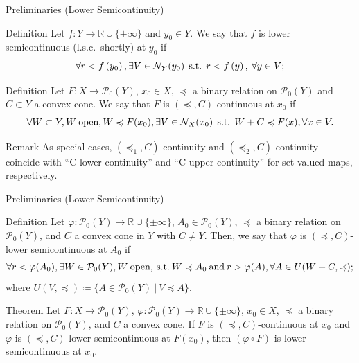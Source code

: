\documentclass[aspectratio=169, dvipdfmx, 11pt]{beamer}
\newcommand{\RealNumberSet}{\mathbb{R}}
\newcommand{\Nbd}[2]{\mbox{$\mathcal{N}_{#1}({#2})$}}
\newcommand{\pow}[1]{\mathcal{P}_{0}(#1)}
\newcommand{\SuchThat}{\:\text{s.t.}\:}
\newcommand{\SetForm}[2]{
  \{{#1}\:|\:{#2}\}
}
\begin{document}
\begin{frame}{Preliminaries (Lower Semicontinuity)}
  \begin{block}{Definition}
    Let $f:Y\rightarrow \RealNumberSet \cup \{ \pm \infty\}$ and $y_{0}\in{Y}$.
    We say that $f$ is
    lower semicontinuous (l.s.c.\ shortly) at $y_{0}$ if
    \begin{equation}
      \forall r < f \left( y_{0} \right),
      \exists V \in \Nbd{Y}{y_{0}} \:\SuchThat\: r < f \left( y \right),\: \forall y \in V; \notag
    \end{equation}
  \end{block}

  \begin{block}{Definition \cite{500001551932}}
    Let $F \colon X \to \pow{Y}$, $x_0 \in X$, $\preccurlyeq$ a binary relation on $\pow{Y}$
    and $C \subset Y$ a convex cone. We say that $F$ is $(\preccurlyeq, C)$-continuous at $x_0$ if
    \begin{equation}
      \forall W \subset Y, W\:\text{open},W \preccurlyeq F(x_0), \exists V \in \mathcal{N}_{X}(x_0) \:\SuchThat\: W + C \preccurlyeq F(x), \forall x \in V. \notag
    \end{equation}
  \end{block}

  \begin{alertblock}{Remark}
    As special cases, $(\preccurlyeq_1, C)$-continuity and $(\preccurlyeq_2, C)$-continuity coincide with “C-lower
    continuity” and “C-upper continuity” for set-valued maps, respectively.
  \end{alertblock}
\end{frame}

\begin{frame}{Preliminaries (Lower Semicontinuity)}
  \begin{block}{Definition \cite{500001551932}}
    Let $\varphi \colon \pow{Y} \to \RealNumberSet \cup \{\pm \infty\}$, $A_0 \in \pow{Y}$,
    $\preccurlyeq$ a binary relation on $\pow{Y}$, and $C$ a convex cone in $Y$ with $C \ne Y$. Then,
    we say that $\varphi$ is $(\preccurlyeq, C)$-lower semicontinuous at $A_0$ if
    \begin{equation}
      \forall r < \varphi (A_0), \exists W \in \pow{Y}, W\:\text{open}, \SuchThat W \preccurlyeq A_0 \:\text{and}\:
      r > \varphi (A), \forall A \in U(W + C, \preccurlyeq); \notag
    \end{equation}
    where $U(V,\preccurlyeq) \coloneqq \SetForm{A \in \pow{Y}}{V \preccurlyeq A}$.
  \end{block}

  \begin{block}{Theorem \cite{500001551932}}
    Let $F \colon X \to \pow{Y}$, $\varphi \colon \pow{Y} \to \RealNumberSet \cup \{\pm \infty\}$, $x_0 \in X$,
    $\preccurlyeq$ a binary relation on $\pow{Y}$, and $C$ a convex cone. If $F$ is $(\preccurlyeq, C)$-continuous at $x_0$
    and $\varphi$ is $(\preccurlyeq, C)$-lower semicontinuous at $F(x_0)$, then $(\varphi \circ F)$ is lower semicontinuous at $x_0$.
  \end{block}
\end{frame}
\end{document}
